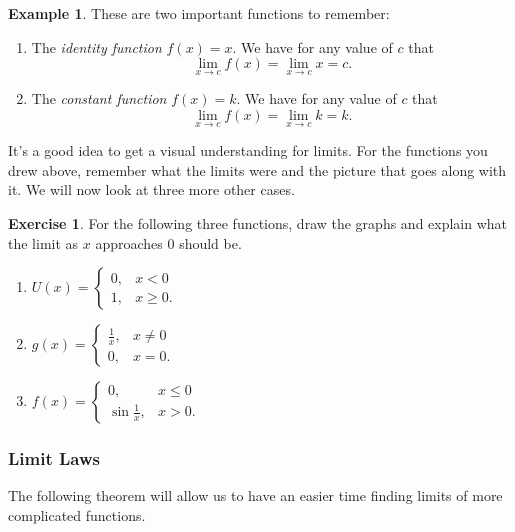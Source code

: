 \documentclass[leqno]{article}
\theoremstyle{definition}
\newtheorem{example}{Example}[section]
\newtheorem{exercise}{Exercise}[section]
\theoremstyle{remark}
\theoremstyle{theorem}
\begin{document}
\begin{example}
These are two important functions to remember:
\begin{enumerate}[1.]
\item The \emph{identity function} $f(x)=x$.  We have for any value of $c$ that
\[
\lim_{x\to c}f(x)=\lim_{x\to c} x = c.
\]
\item The \emph{constant function} $f(x)=k$. We have for any value of $c$ that
\[
\lim_{x\to c}f(x)=\lim_{x\to c} k = k.
\]
\end{enumerate}
\end{example}

It's a good idea to get a visual understanding for limits.  For the functions you drew above, remember what the limits were and the picture that goes along with it.  We will now look at three more other cases.

\begin{exercise}
For the following three functions, draw the graphs and explain what the limit as $x$ approaches $0$ should be.
\begin{enumerate}[1.]
\item $U(x)=
\begin{cases}
0, & x<0\\
1, & x\geq 0.
\end{cases}$
\item $g(x)=
\begin{cases}
\frac{1}{x}, & x\neq 0\\
0, & x=0.
\end{cases}$
\item $f(x)=
\begin{cases}
0, & x\leq 0\\
\sin\frac{1}{x}, & x>0.
\end{cases}$
\end{enumerate}
\vspace*{6cm}
\end{exercise}

\subsubsection{Limit Laws}

The following theorem will allow us to have an easier time finding limits of more complicated functions.
\end{document}
